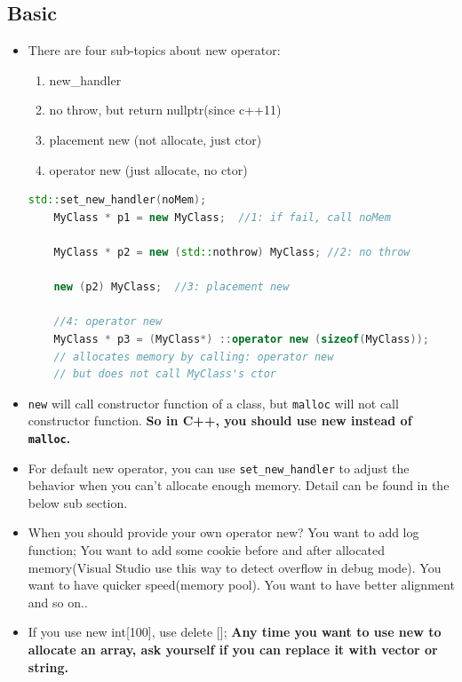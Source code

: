 \documentclass[a4paper,11pt,twoside]{book}
\begin{document}
\subsection{Basic}
\begin{itemize}
	
	\item There are four sub-topics about new operator:
	\begin{enumerate}
		\item new\_handler
		\item no throw, but return nullptr(since c++11)
		\item placement new (not allocate, just ctor)
		\item operator new (just allocate, no ctor)
	\end{enumerate}
	
	\begin{lstlisting}[frame=single, language=c++]
	std::set_new_handler(noMem);
	MyClass * p1 = new MyClass;  //1: if fail, call noMem
	
	MyClass * p2 = new (std::nothrow) MyClass; //2: no throw
	
	new (p2) MyClass;  //3: placement new
	
	//4: operator new
	MyClass * p3 = (MyClass*) ::operator new (sizeof(MyClass));
	// allocates memory by calling: operator new
	// but does not call MyClass's ctor
	\end{lstlisting}
	
	\item \texttt{new} will call constructor function of a class, but \texttt{malloc} will not call constructor function.  \textbf{So in C++, you should use new instead of \texttt{malloc}.}
	
	\item For default new operator, you can use \texttt{set\_new\_handler} to adjust the behavior when you can't allocate enough memory. Detail can be found in the below sub section.
	
	\item When you should provide your own operator new?  You want to add log function; You want to add some cookie before and after allocated memory(Visual Studio use this way to detect overflow in debug mode). You want to have quicker speed(memory pool). You want to have better alignment and so on..
	
	\item If you use new int[100], use delete [];  \textbf{Any time you want to use new to allocate an array, ask yourself if you can replace it with vector or string.}
\end{itemize}
\end{document}
